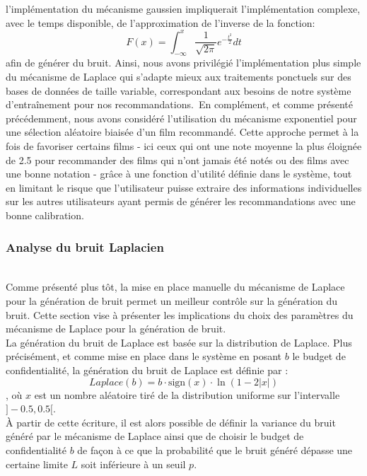\documentclass{article}
\begin{document}
l'implémentation du mécanisme gaussien impliquerait l'implémentation complexe, avec le temps disponible, de l'approximation de l'inverse de la fonction:
\begin{equation}
    F(x) = \int_{-\infty}^{x} \frac{1}{\sqrt{2\pi}} e^{-\frac{t^2}{2}} dt
\end{equation}
afin de générer du bruit. Ainsi, nous avons privilégié l'implémentation plus simple du mécanisme de Laplace qui s’adapte mieux aux traitements
ponctuels sur des bases de données de taille variable, correspondant aux besoins de notre système d'entraînement pour nos recommandations.\
En complément, et comme présenté précédemment, nous avons considéré l'utilisation du mécanisme exponentiel pour une sélection aléatoire biaisée d'un film recommandé.
Cette approche permet à la fois de favoriser certains films - ici ceux qui ont une note moyenne la plus éloignée de 2.5 pour recommander des films qui n'ont jamais été notés ou des
films avec une bonne notation - grâce à une fonction d'utilité définie dans le système, tout en limitant le risque que
l'utilisateur puisse extraire des informations individuelles sur les autres utilisateurs ayant permis de générer les recommandations avec une bonne
calibration.

\subsubsection{Analyse du bruit Laplacien}
$ $\\
Comme présenté plus tôt, la mise en place manuelle du mécanisme de Laplace pour la génération de bruit permet un meilleur contrôle sur la génération du bruit. Cette section vise à présenter
les implications du choix des paramètres du mécanisme de Laplace pour la génération de bruit.\\
La génération du bruit de Laplace est basée sur la distribution de Laplace. Plus précisément, et comme mise en place dans le système en posant $b$ le budget de confidentialité, la génération du bruit de Laplace est définie par :
\begin{equation}
    Laplace(b) = b \cdot \text{sign}(x) \cdot \ln(1 - 2|x|)
    \label{eq:laplace}
\end{equation}
, où $x$ est un nombre aléatoire tiré de la distribution uniforme sur l'intervalle \( ]-0.5, 0.5[ \).\\
À partir de cette écriture, il est alors possible de définir la variance du bruit généré par le mécanisme de Laplace ainsi que de choisir le budget de confidentialité 
$b$ de façon à ce que la probabilité que le bruit généré dépasse une certaine limite $L$ soit inférieure à un seuil $p$.\\
\end{document}
